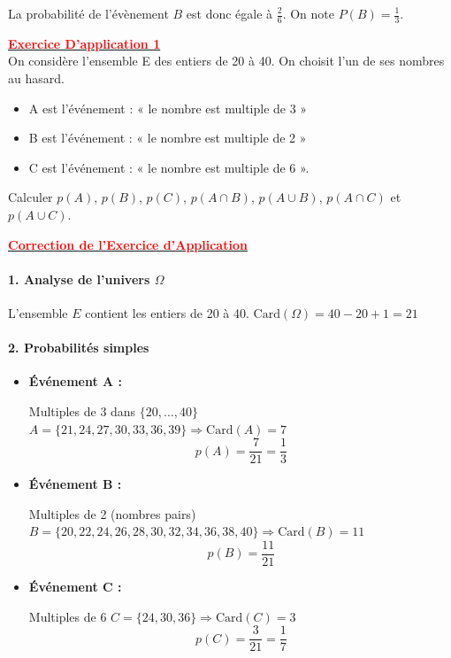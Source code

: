 \documentclass[12pt,a4paper]{article}
\begin{document}
La probabilité de l'évènement $B$ est donc égale à $\frac{2}{6}$. On note $P(B)=\frac{1}{3}$.

\underline{\textbf{\textcolor{red}{Exercice D'application 1}}}\\
On considère l’ensemble E des entiers de 20 à 40. On choisit l’un de ses nombres au hasard.

\begin{itemize}
\item[•] A est l’événement : « le nombre est multiple de 3 »
\item[•] B est l’événement : « le nombre est multiple de 2 »
\item[•] C est l’événement : « le nombre est multiple de 6 ».
\end{itemize}
Calculer $p(A)$, $p(B)$, $p(C)$, $p(A\cap B)$, $p(A\cup B)$, $p(A\cap C)$ et $p(A\cup C)$.

\underline{\textbf{\textcolor{red}{Correction de l'Exercice d'Application}}}

\paragraph{1. Analyse de l'univers $\Omega$}
L'ensemble $E$ contient les entiers de 20 à 40.
$\text{Card}(\Omega) = 40 - 20 + 1 = 21$

\paragraph{2. Probabilités simples}

\begin{itemize}
    \item \textbf{Événement A :} 
    
    Multiples de 3 dans $\{20, \dots, 40\}$
    $A = \{21, 24, 27, 30, 33, 36, 39\} \Rightarrow \text{Card}(A) = 7$
    \[ p(A) = \frac{7}{21} = \frac{1}{3} \]

    \item \textbf{Événement B :} 
    
    Multiples de 2 (nombres pairs)
    $B = \{20, 22, 24, 26, 28, 30, 32, 34, 36, 38, 40\} \Rightarrow \text{Card}(B) = 11$
    \[ p(B) = \frac{11}{21} \]

    \item \textbf{Événement C :} 
    
    Multiples de 6
    $C = \{24, 30, 36\} \Rightarrow \text{Card}(C) = 3$
    \[ p(C) = \frac{3}{21} = \frac{1}{7} \]
\end{itemize}
\end{document}
